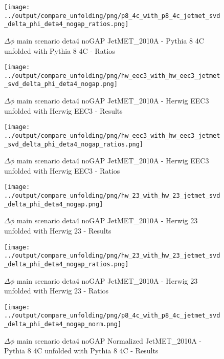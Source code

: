 \documentclass[11pt]{book}
\begin{document}
\begin{figure}[ht]
\centering
\texttt{[image: ../output/compare\_unfolding/png/p8\_4c\_with\_p8\_4c\_jetmet\_svd\_delta\_phi\_deta4\_nogap\_ratios.png]}
\caption{$\Delta\phi$ main scenario deta4 noGAP JetMET\_2010A - Pythia 8 4C unfolded with Pythia 8 4C - Ratios}
\label{p8_p8_jetmet_svd_delta_phi_deta4_nogap_b}
\end{figure}

\begin{figure}[ht]
\centering
\texttt{[image: ../output/compare\_unfolding/png/hw\_eec3\_with\_hw\_eec3\_jetmet\_svd\_delta\_phi\_deta4\_nogap.png]}
\caption{$\Delta\phi$ main scenario deta4 noGAP JetMET\_2010A - Herwig EEC3 unfolded with Herwig EEC3 - Results}
\label{hw_eec3_hw_eec3_jetmet_svd_delta_phi_deta4_nogap_a}
\end{figure}

\begin{figure}[ht]
\centering
\texttt{[image: ../output/compare\_unfolding/png/hw\_eec3\_with\_hw\_eec3\_jetmet\_svd\_delta\_phi\_deta4\_nogap\_ratios.png]}
\caption{$\Delta\phi$ main scenario deta4 noGAP JetMET\_2010A - Herwig EEC3 unfolded with Herwig EEC3 - Ratios}
\label{hw_eec3_hw_eec3_jetmet_svd_delta_phi_deta4_nogap_b}
\end{figure}

\begin{figure}[ht]
\centering
\texttt{[image: ../output/compare\_unfolding/png/hw\_23\_with\_hw\_23\_jetmet\_svd\_delta\_phi\_deta4\_nogap.png]}
\caption{$\Delta\phi$ main scenario deta4 noGAP JetMET\_2010A - Herwig 23 unfolded with Herwig 23 - Results}
\label{hw_23_hw_23_jetmet_svd_delta_phi_deta4_nogap_a}
\end{figure}

\begin{figure}[ht]
\centering
\texttt{[image: ../output/compare\_unfolding/png/hw\_23\_with\_hw\_23\_jetmet\_svd\_delta\_phi\_deta4\_nogap\_ratios.png]}
\caption{$\Delta\phi$ main scenario deta4 noGAP JetMET\_2010A - Herwig 23 unfolded with Herwig 23 - Ratios}
\label{hw_23_hw_23_jetmet_svd_delta_phi_deta4_nogap_b}
\end{figure}


\begin{figure}[ht]
\centering
\texttt{[image: ../output/compare\_unfolding/png/p8\_4c\_with\_p8\_4c\_jetmet\_svd\_delta\_phi\_deta4\_nogap\_norm.png]}
\caption{$\Delta\phi$ main scenario deta4 noGAP Normalized JetMET\_2010A - Pythia 8 4C unfolded with Pythia 8 4C - Results}
\label{p8_p8_jetmet_svd_delta_phi_deta4_nogap_norm_a}
\end{figure}
\end{document}
